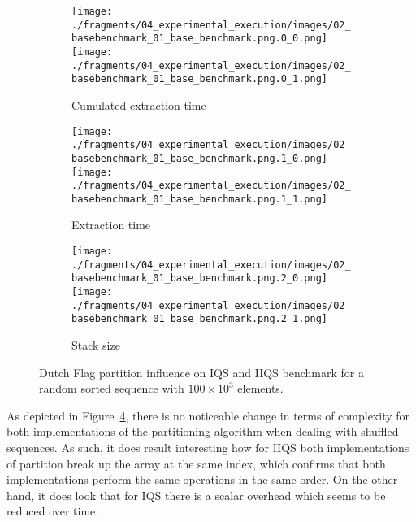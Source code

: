 \begin{figure}
    \centering
    \begin{subfigure}[b]{\textwidth}
        \centering
        \texttt{[image: ./fragments/04\_experimental\_execution/images/02\_basebenchmark\_01\_base\_benchmark.png.0\_0.png]}
        \texttt{[image: ./fragments/04\_experimental\_execution/images/02\_basebenchmark\_01\_base\_benchmark.png.0\_1.png]}
        \caption{Cumulated extraction time}
        \label{FIG:PARTITION_SCHEME_01_SHUFFLED__0_0}
    \end{subfigure}

    \begin{subfigure}[b]{\textwidth}
        \centering
        \texttt{[image: ./fragments/04\_experimental\_execution/images/02\_basebenchmark\_01\_base\_benchmark.png.1\_0.png]}
        \texttt{[image: ./fragments/04\_experimental\_execution/images/02\_basebenchmark\_01\_base\_benchmark.png.1\_1.png]}
        \caption{Extraction time}
        \label{FIG:PARTITION_SCHEME_01_SHUFFLED__0_0}
    \end{subfigure}

    \begin{subfigure}[b]{\textwidth}
        \centering
        \texttt{[image: ./fragments/04\_experimental\_execution/images/02\_basebenchmark\_01\_base\_benchmark.png.2\_0.png]}
        \texttt{[image: ./fragments/04\_experimental\_execution/images/02\_basebenchmark\_01\_base\_benchmark.png.2\_1.png]}
        \caption{Stack size}
        \label{FIG:PARTITION_SCHEME_01_SHUFFLED__0_0}
    \end{subfigure}
    
    \caption{Dutch Flag partition influence on IQS and IIQS benchmark for a random sorted sequence with $100\times10^3$ elements.}
    \label{FIG:PARTITION_SCHEME_01_SHUFFLED}
\end{figure}


As depicted in Figure~\ref{FIG:PARTITION_SCHEME_01_SHUFFLED}, there is no noticeable change in terms of complexity for both implementations of the partitioning algorithm when dealing with shuffled sequences. As such, it does result interesting how for IIQS both implementations of partition break up the array at the same index, which confirms that both implementations perform the same operations in the same order. On the other hand, it does look that for IQS there is a scalar overhead which seems to be reduced over time. \\



